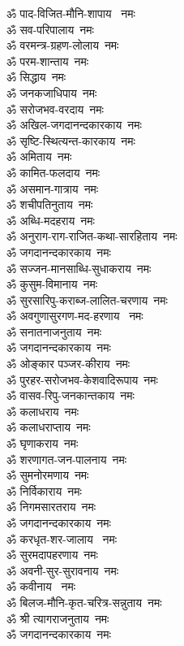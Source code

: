 \begin{flushleft}
\begin{multicols}{2}
ॐ पाद-विजित-मौनि-शापाय ~नमः\\
ॐ सव-परिपालाय~नमः\hfill{}\\
ॐ वरमन्त्र-ग्रहण-लोलाय~नमः\\
ॐ परम-शान्ताय~नमः\\
ॐ सिद्धाय~नमः\\
ॐ जनकजाधिपाय~नमः\\
ॐ सरोजभव-वरदाय~नमः\\
ॐ अखिल-जगदानन्दकारकाय~नमः\\
ॐ सृष्टि-स्थित्यन्त-कारकाय~नमः\\
ॐ अमिताय~नमः\\
ॐ कामित-फलदाय~नमः\\
ॐ असमान-गात्राय~नमः\hfill{}\\
ॐ शचीपतिनुताय~नमः\\
ॐ अब्धि-मदहराय~नमः\\
ॐ अनुराग-राग-राजित-कथा-सारहिताय~नमः\\
ॐ जगदानन्दकारकाय~नमः\\
ॐ सज्जन-मानसाब्धि-सुधाकराय~नमः\\
ॐ कुसुम-विमानाय~नमः\\
ॐ सुरसारिपु-कराब्ज-लालित-चरणाय~नमः\\
ॐ अवगुणासुरगण-मद-हरणाय ~नमः\\
ॐ सनातनाजनुताय~नमः\\
ॐ जगदानन्दकारकाय~नमः\hfill{}\\
ॐ ओङ्कार पञ्जर-कीराय~नमः\\
ॐ पुरहर-सरोजभव-केशवादिरूपाय~नमः\\
ॐ वासव-रिपु-जनकान्तकाय~नमः\\
ॐ कलाधराय~नमः\\
ॐ कलाधराप्ताय~नमः\\
ॐ घृणाकराय~नमः\\
ॐ शरणागत-जन-पालनाय~नमः\\
ॐ सुमनोरमणाय~नमः\\
ॐ निर्विकाराय~नमः\\
ॐ निगमसारतराय~नमः\hfill{}\\
ॐ जगदानन्दकारकाय~नमः\\
ॐ करधृत-शर-जालाय ~नमः\\
ॐ सुरमदापहरणाय~नमः\\
ॐ अवनी-सुर-सुरावनाय~नमः\\
ॐ कवीनाय ~नमः\\
ॐ बिलज-मौनि-कृत-चरित्र-सन्नुताय~नमः\\
ॐ श्री त्यागराजनुताय~नमः\\
ॐ जगदानन्दकारकाय~नमः\\

\end{multicols}
\end{flushleft}
